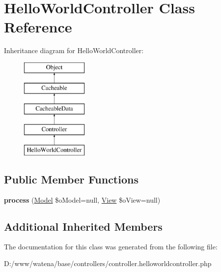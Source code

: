 \hypertarget{class_hello_world_controller}{\section{Hello\-World\-Controller Class Reference}
\label{class_hello_world_controller}
}
Inheritance diagram for Hello\-World\-Controller\-:\begin{figure}[H]
\begin{center}
\leavevmode
\includegraphics[height=5.000000cm]{class_hello_world_controller}
\end{center}
\end{figure}
\subsection*{Public Member Functions}
\begin{DoxyCompactItemize}
\item 
\hypertarget{class_hello_world_controller_a6655b67e3a93622d927ea7d9c3e1ecbc}{{\bfseries process} (\hyperlink{class_model}{Model} \$o\-Model=null, \hyperlink{class_view}{View} \$o\-View=null)}\label{class_hello_world_controller_a6655b67e3a93622d927ea7d9c3e1ecbc}

\end{DoxyCompactItemize}
\subsection*{Additional Inherited Members}


The documentation for this class was generated from the following file\-:\begin{DoxyCompactItemize}
\item 
D\-:/www/watena/base/controllers/controller.\-helloworldcontroller.\-php\end{DoxyCompactItemize}
